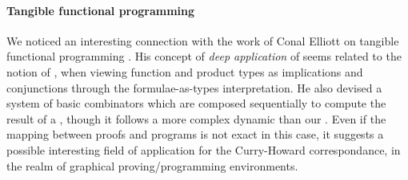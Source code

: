 \begin{scope}

\paragraph{Tangible functional programming}

We noticed an interesting connection with the work of Conal Elliott on
tangible functional programming . His concept
of \emph{deep application} of  seems related to the
notion of , when viewing function and product types
as implications and conjunctions through the formulae-as-types
interpretation. He also devised a system of basic combinators which
are composed sequentially to compute the result of a , though it
follows a more complex dynamic than our . Even if the
mapping between proofs and programs is not exact in this case, it
suggests a possible interesting field of application for the
Curry-Howard correspondance, in the realm of graphical
proving/programming environments.

\end{scope}